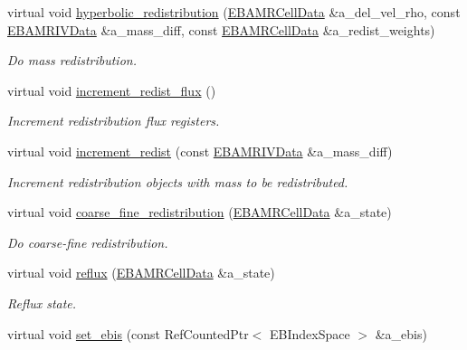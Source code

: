 \begin{DoxyCompactItemize}
virtual void \hyperlink{classcdr__solver_a53fc7567848bcc6e21e2b8fcee8d20bf}{hyperbolic\+\_\+redistribution} (\hyperlink{type__definitions_8H_a7e610f301989e5e07781c5e338bdb7c3}{E\+B\+A\+M\+R\+Cell\+Data} \&a\+\_\+del\+\_\+vel\+\_\+rho, const \hyperlink{type__definitions_8H_a6b8fa905d55cbb491b52180386f0e0c1}{E\+B\+A\+M\+R\+I\+V\+Data} \&a\+\_\+mass\+\_\+diff, const \hyperlink{type__definitions_8H_a7e610f301989e5e07781c5e338bdb7c3}{E\+B\+A\+M\+R\+Cell\+Data} \&a\+\_\+redist\+\_\+weights)
\begin{DoxyCompactList}\small\item\em Do mass redistribution. \end{DoxyCompactList}\item 
virtual void \hyperlink{classcdr__solver_a2de31a79bf658a5fa979066affa730da}{increment\+\_\+redist\+\_\+flux} ()
\begin{DoxyCompactList}\small\item\em Increment redistribution flux registers. \end{DoxyCompactList}\item 
virtual void \hyperlink{classcdr__solver_ab814e17e6fc093d465f99e08106a9f83}{increment\+\_\+redist} (const \hyperlink{type__definitions_8H_a6b8fa905d55cbb491b52180386f0e0c1}{E\+B\+A\+M\+R\+I\+V\+Data} \&a\+\_\+mass\+\_\+diff)
\begin{DoxyCompactList}\small\item\em Increment redistribution objects with mass to be redistributed. \end{DoxyCompactList}\item 
virtual void \hyperlink{classcdr__solver_aa3ea1fb64f7291c34b3a68a7f7740661}{coarse\+\_\+fine\+\_\+redistribution} (\hyperlink{type__definitions_8H_a7e610f301989e5e07781c5e338bdb7c3}{E\+B\+A\+M\+R\+Cell\+Data} \&a\+\_\+state)
\begin{DoxyCompactList}\small\item\em Do coarse-\/fine redistribution. \end{DoxyCompactList}\item 
virtual void \hyperlink{classcdr__solver_aed7b05af4016231eba172749891c08d8}{reflux} (\hyperlink{type__definitions_8H_a7e610f301989e5e07781c5e338bdb7c3}{E\+B\+A\+M\+R\+Cell\+Data} \&a\+\_\+state)
\begin{DoxyCompactList}\small\item\em Reflux state. \end{DoxyCompactList}\item 
virtual void \hyperlink{classcdr__solver_a152c2239dc5e0bcc392f4c3c2fd337c8}{set\+\_\+ebis} (const Ref\+Counted\+Ptr$<$ E\+B\+Index\+Space $>$ \&a\+\_\+ebis)

\end{DoxyCompactItemize}
